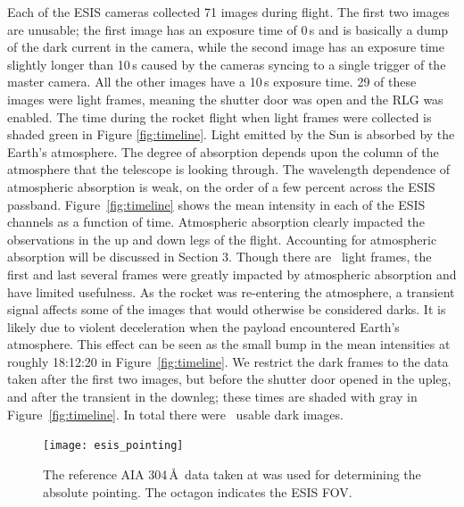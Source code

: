 		Each of the ESIS cameras collected 71 images during flight.  
		The first two images are unusable; the first image has an exposure time of 0\,s and is basically a dump of the dark current in the camera, while the second image has an exposure time slightly longer than 10\,s caused by the cameras syncing to a single trigger of the master camera.  
		All the other images have a 10\,s exposure time. 
		29 of these images were light frames, meaning the shutter door was open and the RLG was enabled. 
		The time during the rocket flight when light frames were collected is shaded green in Figure \ref{fig:timeline}.  
		Light emitted by the Sun is absorbed by the Earth's atmosphere.  
		The degree of absorption depends upon the column of the atmosphere that the telescope is looking through. The wavelength dependence of atmospheric absorption is weak, on the order of a few percent across the ESIS passband.  
		Figure~\ref{fig:timeline} shows the mean intensity in each of the ESIS channels as a function of time.  Atmospheric absorption clearly impacted the observations in the up and down legs of the flight.  
		Accounting for atmospheric absorption will be discussed in Section 3.  
		Though there are \numDataFrames\ light frames, the first and last several frames were greatly impacted by atmospheric absorption and have limited usefulness.  As the rocket was re-entering the atmosphere, a transient signal affects some of the images that would otherwise be considered darks.  It is likely due to violent deceleration when the payload encountered Earth's atmosphere.
		This effect can be seen as the small bump in the mean intensities at roughly 18:12:20 in Figure~\ref{fig:timeline}.  
		We restrict the dark frames to the data taken after the first two images, but before the shutter door opened in the upleg, and after the transient in the downleg; these times are shaded with gray in Figure~\ref{fig:timeline}.  
		In total there were \numDarkFrames\ usable dark images.  
		
		
		
		\begin{figure}[ht]
			\begin{center}
				\texttt{[image: esis\_pointing]}
				\caption{The reference AIA 304\,\AA\ data taken at \aianearapogee was used for determining the absolute pointing. The octagon indicates the ESIS FOV.}
				\label{fig:fov}
			\end{center}
		\end{figure}
	

